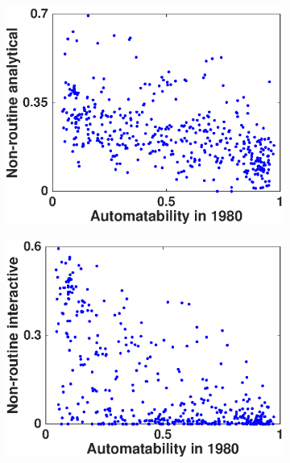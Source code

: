 \documentclass[11pt]{report}
\numberwithin{equation}{chapter}
\begin{document}
\begin{spacing}{2}
\begin{figure}[!htb]
\begin{subfigure}{0.5\textwidth}
\centering
	\includegraphics[scale = 0.5]{non-routine_analytical.eps}
\end{subfigure}%
\begin{subfigure}{0.5\textwidth}
\centering
	\includegraphics[scale = 0.5]{non-routine_interactive.eps}
\end{subfigure}\\\centering
\begin{subfigure}{0.5\textwidth}
\centering

\end{subfigure}
\end{figure}
\end{spacing}
\end{document}
